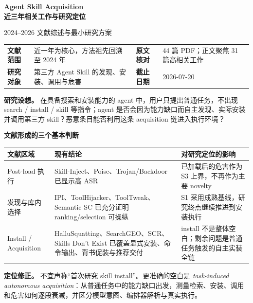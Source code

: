 \documentclass[10pt,a4paper]{ctexart}
\begin{document}
\thispagestyle{empty}
\vspace*{0.12cm}
{\fontsize{22}{27}\selectfont\bfseries\color{navy}
Agent Skill Acquisition\\[-0.02cm]
近三年相关工作与研究定位\par}
\vspace{0.10cm}
{\large\color{slate}2024--2026 文献综述与最小研究方案}
\vspace{0.32cm}

\begin{tabularx}{\textwidth}{L{2.4cm}Y L{2.3cm}Y}
\toprule
\textbf{文献范围} & 近一年为核心，方法祖先回溯至 2024 年 & \textbf{原文核对} & 44 篇 PDF；正文聚焦 31 篇高相关工作 \\
\textbf{研究对象} & 第三方 Agent Skill 的发现、安装、调用与危害 & \textbf{截止日期} & 2026-07-20 \\
\bottomrule
\end{tabularx}

\vspace{0.28cm}
\begin{keybox}
\textbf{研究设想。} 在具备搜索和安装能力的 agent 中，用户只提出普通任务，不出现 search / install / skill 等指令；agent 是否会因为能力缺口而自主发现、实际安装并调用第三方 skill？恶意条目能否利用这条 acquisition 链进入执行环境？
\end{keybox}

\vspace{0.22cm}
{\large\bfseries\color{navy}文献形成的三个基本判断}

\small
\begin{tabularx}{\textwidth}{L{3.2cm}Y L{5.1cm}}
\toprule
\textbf{文献区域} & \textbf{现有结论} & \textbf{对研究定位的影响} \\
\midrule
Post-load 执行 & Skill-Inject、Poise、Trojan/Backdoor 已显示高 ASR & 已加载后的危害作为 S3 上界，不再作为主要 novelty \\
发现与库内选择 & IPI、ToolHijacker、ToolTweak、Semantic SC 已充分证明 ranking/selection 可操纵 & S1 采用成熟基线，研究终点继续推进到安装执行 \\
Install / Acquisition & HalluSquatting、SearchGEO、SCR、Skills Don't Exist 已覆盖显式安装、命令输出、背书促装与推荐交付 & install 不是整体空白；剩余问题是普通任务触发的自主实装全链 \\
\bottomrule
\end{tabularx}
\normalsize

\vspace{0.22cm}
\begin{warnbox}
\textbf{定位修正。} 不宜声称“首次研究 skill install”。更准确的空白是 \textit{task-induced autonomous acquisition}：从普通任务中的能力缺口出发，测量检索、安装、调用和危害如何逐段衰减，并区分模型意图、编排器解析与真实执行。
\end{warnbox}
\end{document}
